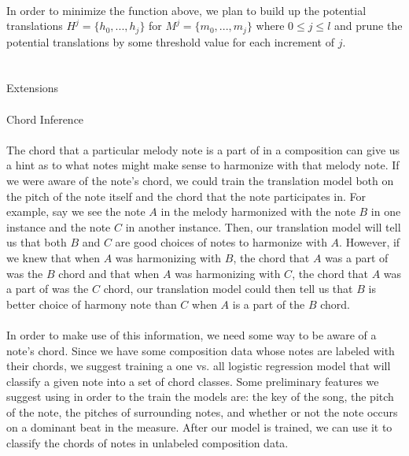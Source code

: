 \documentclass[letterpaper,12pt]{article}
\begin{document}
\\
In order to minimize the function above, we plan to build up the potential translations $H^{j} = \{h_{0}, ... , h_{j}\}$ for $M^{j} = \{m_{0}, ... , m_{j}\}$ where $0 \leq j \leq l$ and prune the potential translations by some threshold value for each increment of $j$.\\
\\
\\
Extensions\\
\\
Chord Inference\\
\\
The chord that a particular melody note is a part of in a composition can give us a hint as to what notes might make sense to harmonize with that melody note. If we were aware of the note's chord, we could train the translation model both on the pitch of the note itself and the chord that the note participates in. For example, say we see the note $A$ in the melody harmonized with the note $B$ in one instance and the note $C$ in another instance. Then, our translation model will tell us that both $B$ and $C$ are good choices of notes to harmonize with $A$. However, if we knew that when $A$ was harmonizing with $B$, the chord that $A$ was a part of was the $B$ chord and that when $A$ was harmonizing with $C$, the chord that $A$ was a part of was the $C$ chord, our translation model could then tell us that $B$ is better choice of harmony note than $C$ when $A$ is a part of the $B$ chord.\\
\\
In order to make use of this information, we need some way to be aware of a note's chord. Since we have some composition data whose notes are labeled with their chords, we suggest training a one vs. all logistic regression model that will classify a given note into a set of chord classes. Some preliminary features we suggest using in order to the train the models are: the key of the song, the pitch of the note, the pitches of surrounding notes, and whether or not the note occurs on a dominant beat in the measure. After our model is trained, we can use it to classify the chords of notes in unlabeled composition data.\\



\vfill
\end{document}
